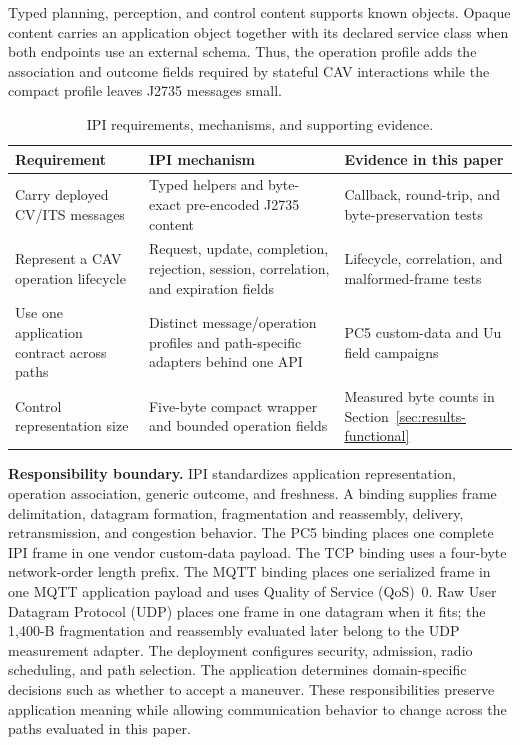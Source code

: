 Typed planning, perception, and control content supports known objects. Opaque
content carries an application object together with its declared service class
when both endpoints use an external schema. Thus, the operation profile adds
the association and outcome fields required by stateful CAV interactions while
the compact profile leaves J2735 messages small.

\begin{table}[t]
  \caption{IPI requirements, mechanisms, and supporting evidence.}
  \label{tab:ipi-design}
  \centering
  \footnotesize
  \setlength{\tabcolsep}{4pt}
  \renewcommand{\arraystretch}{1.10}
  \begin{tabular}{@{}p{}p{}p{}@{}}
    \toprule
    Requirement & IPI mechanism & Evidence in this paper \\
    \midrule
    Carry deployed CV/ITS messages & Typed helpers and byte-exact pre-encoded J2735 content & Callback, round-trip, and byte-preservation tests \\
    Represent a CAV operation lifecycle & Request, update, completion, rejection, session, correlation, and expiration fields & Lifecycle, correlation, and malformed-frame tests \\
    Use one application contract across paths & Distinct message/operation profiles and path-specific adapters behind one API & PC5 custom-data and Uu field campaigns \\
    Control representation size & Five-byte compact wrapper and bounded operation fields & Measured byte counts in Section~\ref{sec:results-functional} \\
    \bottomrule
  \end{tabular}
\end{table}

\textbf{Responsibility boundary.}
IPI standardizes application representation, operation association, generic
outcome, and freshness. A binding supplies frame delimitation, datagram
formation, fragmentation and reassembly, delivery, retransmission, and
congestion behavior. The PC5 binding places one complete IPI frame in one
vendor custom-data payload. The TCP binding uses a four-byte network-order
length prefix. The MQTT binding places one serialized frame in one MQTT
application payload and uses Quality of Service (QoS)~0. Raw User Datagram
Protocol (UDP) places one frame in one
datagram when it fits; the
1,400-B fragmentation and reassembly evaluated later belong to the UDP
measurement adapter. The deployment configures security, admission, radio
scheduling, and path selection. The application determines
domain-specific decisions such as whether to accept a maneuver. These
responsibilities preserve application meaning while allowing communication behavior to
change across the paths evaluated in this paper.

